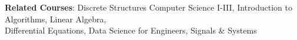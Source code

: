 
\begin{itemize}[leftmargin=0.15in, label={}]
    \small{\item{
        \textbf{Related Courses}{: 
            Discrete Structures Computer Science I-III, 
            Introduction to Algorithms,
            Linear Algebra, 
            \\ \hspace{2.75cm}
            Differential Equations,
            Data Science for Engineers,
            Signals \& Systems
        } \\
    }}
\end{itemize}